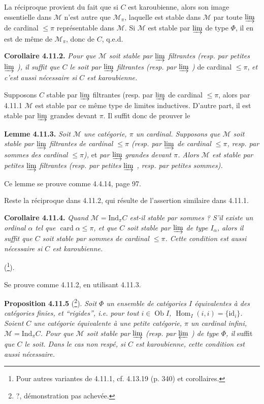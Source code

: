 \documentclass[11pt]{article}
\newcommand{\msp}[1]{\marginpar{\footnotesize [#1]}}
\newcommand{\Ind}{\mathrm{Ind}}
\newcommand{\Hom}{\operatorname{Hom}}
\begin{document}
La réciproque provient du fait que si $C$ est karoubienne, alors son image essentielle dans $\mathcal{M}$ n'est autre que $\mathcal{M}_\pi$, laquelle est stable dans $\mathcal{M}$ par toute $\varinjlim$ de cardinal $\leqslant \pi$ représentable dans $\mathcal{M}$. Si $\mathcal{M}$ est stable par $\varinjlim$ de type $\Phi$, il en est de même de $\mathcal{M}_\pi$, donc de $C$, q.e.d.

\textbf{Corollaire 4.11.2.} \textit{Pour que $\mathcal{M}$ soit stable par $\varinjlim$ filtrantes (resp. par petites $\varinjlim$ ), il suffit que $C$ le soit par $\varinjlim$ filtrantes (resp. par $\varinjlim$ )} de cardinal $\leqslant \pi$, \textit{et c'est aussi nécessaire si $C$ est karoubienne.}

Supposons $C$ stable par $\varinjlim$ filtrantes \msp{page 270} (resp. par $\varinjlim$ de cardinal $\leqslant \pi$, alors par 4.11.1 $\mathcal{M}$ est stable par ce même type de limites inductives. D'autre part, il est stable par $\varinjlim$ grandes devant $\pi$. Il suffit donc de prouver le

\textbf{Lemme 4.11.3.} \textit{Soit $\mathcal{M}$ une catégorie, $\pi$ un cardinal. Supposons que $\mathcal{M}$ soit stable par $\varinjlim$ filtrantes de cardinal $\leqslant \pi$ (resp. par $\varinjlim$ de cardinal $\leqslant \pi$, resp. par sommes des cardinal $\leqslant \pi$),} et \textit{par $\varinjlim$ grandes devant $\pi$. Alors $\mathcal{M}$ est stable par petites $\varinjlim$ filtrantes (resp. par petites $\varinjlim$ , resp. par petites sommes).} %

Ce lemme se prouve comme 4.4.14, page 97.

Reste la réciproque dans 4.11.2, qui résulte de l'assertion similaire dans 4.11.1.

\textbf{Corollaire 4.11.4.} \textit{Quand $\mathcal{M} = \Ind_\pi C$ est-il stable par sommes ? S'il existe un ordinal $\alpha$ tel que $\operatorname{card}\alpha \leqslant \pi$, et que $C$ soit stable par $\varinjlim$ de type $I_\alpha$, alors il suffit que $C$ soit stable par sommes de cardinal $\leqslant \pi$. Cette condition est aussi nécessaire si $C$ est karoubienne.}

(\footnote{Pour autres variantes de 4.11.1, cf. 4.13.19 (p. 340) et corollaires.}).

Se prouve comme 4.11.2, en utilisant 4.11.3.

\msp{page 271}

\textbf{Proposition 4.11.5} (\footnote{?, démonstration pas achevée.}). \textit{Soit $\Phi$ un ensemble de catégories $I$ équivalentes à des catégories finies, et “rigides”, i.e. pour tout $i \in \operatorname{Ob} I$, $\Hom_I(i,i) = \{\mathrm{id}_i\}$. Soient $C$ une catégorie équivalente à une petite catégorie, $\pi$ un cardinal infini, $\mathcal{M} = \Ind_\pi C$. Pour que $\mathcal{M}$ soit stable par $\varinjlim$ (resp. par $\varprojlim$ ) de type $\Phi$, il} suffit \textit{que $C$ le soit. Dans le cas non respé, si $C$ est karoubienne, cette condition est aussi nécessaire.}
\end{document}
